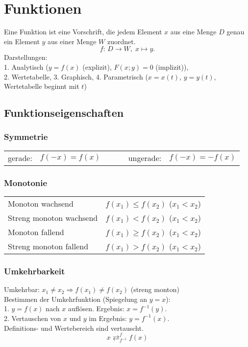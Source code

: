 \section{Funktionen}
Eine Funktion ist eine Vorschrift, die jedem Element $x$ aus eine Menge $D$ genau ein Element $y$ aus einer Menge $W$ zuordnet.
\begin{equation*}
	f\colon\, D\to W,\; x\mapsto y.	
\end{equation*}
Darstellungen:\\
1. Analytisch ($y = f(x)$ (explizit), $F(x;y) = 0$ (implizit)),\\ 2. Wertetabelle, 3. Graphisch, 
4. Parametrisch ($x = x(t)$, $y = y(t)$, Wertetabelle beginnt mit $t$)

\subsection{Funktionseigenschaften}
\subsubsection{Symmetrie}
\begin{tabular}{lcclc}
gerade:	& $f(-x) = f(x)$ & ~~~ & ungerade: & $f(-x) = - f(x)$\\
\end{tabular}

\subsubsection{Monotonie}
\settowidth{\MyLenA}{Streng monoton wachsend~~}
\begin{tabular}{@{}p{\the\MyLenA}%
				@{}p{\linewidth - \the\MyLenA}}
Monoton wachsend & $f(x_1) \leq f(x_2)$ ($x_1 < x_2$) \\
Streng monoton wachsend & $f(x_1) < f(x_2)$ ($x_1 < x_2$)\\
Monoton fallend & $f(x_1) \geq f(x_2)$ ($x_1 < x_2$) \\
Streng monoton fallend & $f(x_1) > f(x_2)$ ($x_1 < x_2$)\\
\end{tabular}

\subsubsection{Umkehrbarkeit}
Umkehrbar: $x_1 \neq x_2 \Rightarrow f(x_1) \neq f(x_2)$ (streng monton)\\
Bestimmen der Umkehrfunktion (Spiegelung an $y=x$):\\
1. $y = f(x)$ nach $x$ auflösen. Ergebnis: $x = f^{-1}(y)$.\\
2. Vertauschen von $x$ und $y$ im Ergebnis: $y = f^{-1}(x)$.\\
Definitions- und Wertebereich sind vertauscht.
\begin{equation*}
	x\mathop{\rightleftarrows}^{f}_{f^{-1}}f(x)
\end{equation*}

